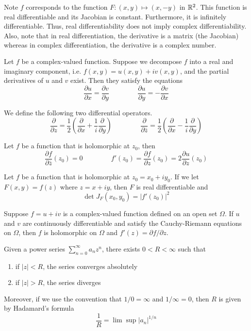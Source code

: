 \documentclass{mathnotes}
\newcommand{\pder}[2][]{\frac{\partial#1}{\partial#2}}
\newcommand{\ipder}[2][]{\partial#1/\partial#2}
\begin{document}
\begin{note}
  Note $f$ corresponds to the function $F:(x,y)\mapsto(x,-y)$ in $\mathbb{R}^2$. This
  function is real differentiable and its Jacobian is constant. Furthermore,
  it is infinitely differentiable. Thus, real differentiability does not imply
  complex differentiability. Also, note that in real differentiation, the
  derivative is a matrix (the Jacobian) whereas in complex differentiation, the
  derivative is a complex number.
\end{note}

\begin{bprop}
  Let $f$ be a complex-valued function. Suppose we decompose $f$ into a real
  and imaginary component, i.e. $f(x,y)=u(x,y)+iv(x,y)$, and the partial
  derivatives of $u$ and $v$ exist. Then they satisfy the equations
  $$\pder[u]{x}=\pder[v]{y}\hspace{50pt}\pder[u]{y}=-\pder[v]{x}$$
\end{bprop}

\begin{defi}
  We define the following two differential operators.
  $$\pder{z}=\frac{1}{2}\left(\pder{x}+\frac{1}{i}\pder{y}\right) \hspace{50pt}
  \pder{\bar z}=\frac{1}{2}\left(\pder{x}-\frac{1}{i}\pder{y}\right)$$
\end{defi}

\begin{prop}
  Let $f$ be a function that is holomorphic at $z_0$, then
  $$\pder[f]{\bar z}(z_0)=0\hspace{50pt}
  f'(z_0)=\pder[f]{z}(z_0)=2\pder[u]{z}(z_0)$$
\end{prop}

\begin{prop}
  Let $f$ be a function that is holomorphic at $z_0=x_0+iy_0$. If we let
  $F(x,y)=f(z)$ where $z=x+iy$, then $F$ is real differentiable and
  $$\det J_F(x_0,y_0)=|f'(z_0)|^2$$
\end{prop}

\begin{thm}
  Suppose $f=u+iv$ is a complex-valued function defined on an open set
  $\Omega$. If $u$ and $v$ are continuously differentiable and satisfy the
  Cauchy-Riemann equations on $\Omega$, then $f$ is holomorphic on $\Omega$ and
  $f'(z)=\ipder[f]{z}$.
\end{thm}

\begin{thm}
  Given a power series $\sum_{n=0}^\infty a_nz^n$, there exists $0<R<\infty$
  such that
  \begin{enumerate}
    \item if $|z|<R$, the series converges absolutely
    \item if $|z|>R$, the series diverges
  \end{enumerate}
  Moreover, if we use the convention that $1/0=\infty$ and $1/\infty=0$, then
  $R$ is given by Hadamard's formula
  $$\frac{1}{R}=\lim\sup|a_n|^{1/n}$$
\end{thm}
\end{document}
